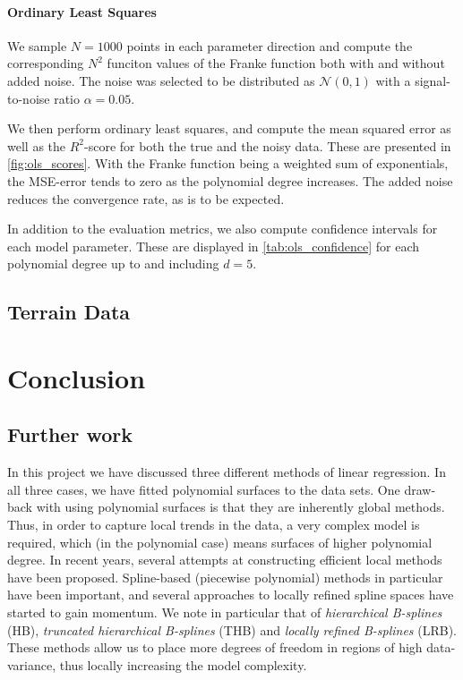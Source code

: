 \documentclass[dvipsnames, article, a4paper, oneside, 12pt]{memoir}
\newcommand{\N}{\mathcal{N}}
\begin{document}
  \subsubsection{Ordinary Least Squares}
  
  We sample \( N = 1000 \) points in each parameter direction and compute the
  corresponding \( N^2 \) funciton values of the Franke function both with and
  without added noise. The noise was selected to be distributed as \( \N(0,
  1) \) with a signal-to-noise ratio \( \alpha = 0.05\).
  
  We then perform ordinary least squares, and compute the mean squared error as
  well as the \( R^2 \)-score for both the true and the noisy data. These are
  presented in \cref{fig:ols_scores}. With the Franke function being a weighted
  sum of exponentials, the MSE-error tends to zero as the polynomial degree
  increases. The added noise reduces the convergence rate, as is to be
  expected. 
  
  In addition to the evaluation metrics, we also compute confidence intervals
  for each model parameter. These are displayed in \cref{tab:ols_confidence}
  for each polynomial degree up to and including \( d = 5 \).
  
  \begin{table}
    \caption{}
    \label{tab:ols_confidence}
  \end{table}
  \section{Terrain Data}
	
  \chapter{Conclusion}

  
  \section{Further work}

  In this project we have discussed three different methods of linear
  regression.  In all three cases, we have fitted polynomial surfaces to the
  data sets. One draw-back with using polynomial surfaces is that they are
  inherently global methods. Thus, in order to capture local trends in the
  data, a very complex model is required, which (in the polynomial case) means
  surfaces of higher polynomial degree. In recent years, several attempts at
  constructing efficient local methods have been proposed. Spline-based
  (piecewise polynomial) methods in particular have been important, and several
  approaches to locally refined spline spaces have started to gain momentum.
  We note in particular that of \emph{hierarchical B-splines} (HB),
  \emph{truncated hierarchical B-splines} (THB) and \emph{locally refined
  B-splines} (LRB). These methods allow us to place more degrees of freedom in regions of high
  data-variance, thus locally increasing the model complexity. 
\end{document}
